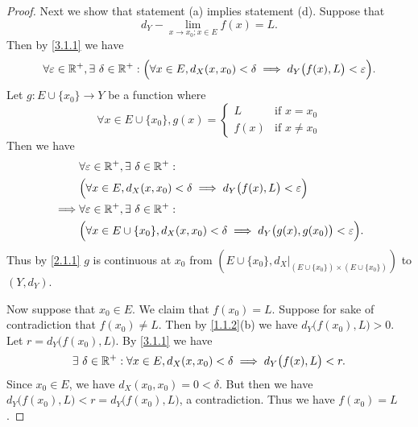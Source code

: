 \begin{proof}
  Next we show that statement (a) implies statement (d).
  Suppose that
  \[
    d_Y - \lim_{x \to x_0 ; x \in E} f(x) = L.
  \]
  Then by \cref{3.1.1} we have
  \[
    \forall \varepsilon \in \mathbb{R}^+, \exists\ \delta \in \mathbb{R}^+ : \Big(\forall x \in E, d_X(x, x_0) < \delta \implies d_Y\big(f(x), L\big) < \varepsilon\Big).
  \]
  Let \(g : E \cup \{x_0\} \to Y\) be a function where
  \[
    \forall x \in E \cup \{x_0\}, g(x) = \begin{cases}
      L    & \text{if } x = x_0    \\
      f(x) & \text{if } x \neq x_0
    \end{cases}
  \]
  Then we have
  \begin{align*}
             & \forall \varepsilon \in \mathbb{R}^+, \exists\ \delta \in \mathbb{R}^+ :                                                       \\
             & \Big(\forall x \in E, d_X(x, x_0) < \delta \implies d_Y\big(f(x), L\big) < \varepsilon\Big)                    \\
    \implies & \forall \varepsilon \in \mathbb{R}^+, \exists\ \delta \in \mathbb{R}^+ :                                                       \\
             & \Big(\forall x \in E \cup \{x_0\}, d_X(x, x_0) < \delta \implies d_Y\big(g(x), g(x_0)\big) < \varepsilon\Big).
  \end{align*}
  Thus by \cref{2.1.1} \(g\) is continuous at \(x_0\) from \((E \cup \{x_0\}, d_X|_{(E \cup \{x_0\}) \times (E \cup \{x_0\})})\) to \((Y, d_Y)\).

  Now suppose that \(x_0 \in E\).
  We claim that \(f(x_0) = L\).
  Suppose for sake of contradiction that \(f(x_0) \neq L\).
  Then by \cref{1.1.2}(b) we have \(d_Y\big(f(x_0), L\big) > 0\).
  Let \(r = d_Y\big(f(x_0), L\big)\).
  By \cref{3.1.1} we have
  \[
    \exists\ \delta \in \mathbb{R}^+ : \forall x \in E, d_X(x, x_0) < \delta \implies d_Y\big(f(x), L\big) < r.
  \]
  Since \(x_0 \in E\), we have \(d_X(x_0, x_0) = 0 < \delta\).
  But then we have \(d_Y\big(f(x_0), L\big) < r = d_Y\big(f(x_0), L\big)\), a contradiction.
  Thus we have \(f(x_0) = L\).


\end{proof}
